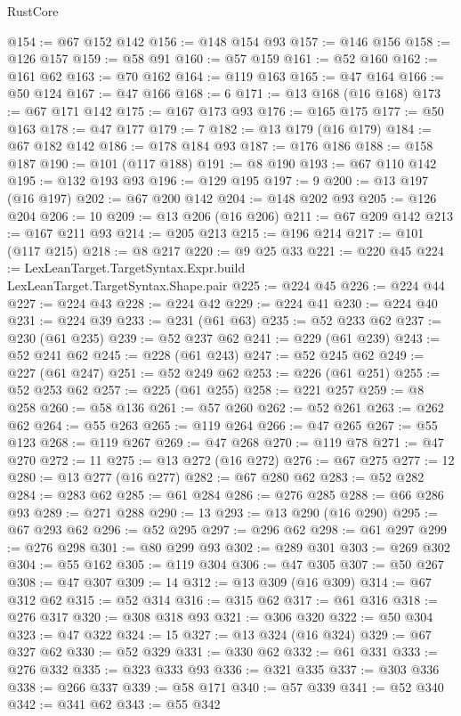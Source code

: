 \begin{lexlean}{RustCore}
\begin{coremodule}
@154 := @67 @152 @142
@156 := @148 @154 @93
@157 := @146 @156
@158 := @126 @157
@159 := @58 @91
@160 := @57 @159
@161 := @52 @160
@162 := @161 @62
@163 := @70 @162
@164 := @119 @163
@165 := @47 @164
@166 := @50 @124
@167 := @47 @166
@168 := 6
@171 := @13 @168 (@16 @168)
@173 := @67 @171 @142
@175 := @167 @173 @93
@176 := @165 @175
@177 := @50 @163
@178 := @47 @177
@179 := 7
@182 := @13 @179 (@16 @179)
@184 := @67 @182 @142
@186 := @178 @184 @93
@187 := @176 @186
@188 := @158 @187
@190 := @101 (@117 @188)
@191 := @8 @190
@193 := @67 @110 @142
@195 := @132 @193 @93
@196 := @129 @195
@197 := 9
@200 := @13 @197 (@16 @197)
@202 := @67 @200 @142
@204 := @148 @202 @93
@205 := @126 @204
@206 := 10
@209 := @13 @206 (@16 @206)
@211 := @67 @209 @142
@213 := @167 @211 @93
@214 := @205 @213
@215 := @196 @214
@217 := @101 (@117 @215)
@218 := @8 @217
@220 := @9 @25 @33
@221 := @220 @45
@224 := LexLeanTarget.TargetSyntax.Expr.build LexLeanTarget.TargetSyntax.Shape.pair
@225 := @224 @45
@226 := @224 @44
@227 := @224 @43
@228 := @224 @42
@229 := @224 @41
@230 := @224 @40
@231 := @224 @39
@233 := @231 (@61 @63)
@235 := @52 @233 @62
@237 := @230 (@61 @235)
@239 := @52 @237 @62
@241 := @229 (@61 @239)
@243 := @52 @241 @62
@245 := @228 (@61 @243)
@247 := @52 @245 @62
@249 := @227 (@61 @247)
@251 := @52 @249 @62
@253 := @226 (@61 @251)
@255 := @52 @253 @62
@257 := @225 (@61 @255)
@258 := @221 @257
@259 := @8 @258
@260 := @58 @136
@261 := @57 @260
@262 := @52 @261
@263 := @262 @62
@264 := @55 @263
@265 := @119 @264
@266 := @47 @265
@267 := @55 @123
@268 := @119 @267
@269 := @47 @268
@270 := @119 @78
@271 := @47 @270
@272 := 11
@275 := @13 @272 (@16 @272)
@276 := @67 @275
@277 := 12
@280 := @13 @277 (@16 @277)
@282 := @67 @280 @62
@283 := @52 @282
@284 := @283 @62
@285 := @61 @284
@286 := @276 @285
@288 := @66 @286 @93
@289 := @271 @288
@290 := 13
@293 := @13 @290 (@16 @290)
@295 := @67 @293 @62
@296 := @52 @295
@297 := @296 @62
@298 := @61 @297
@299 := @276 @298
@301 := @80 @299 @93
@302 := @289 @301
@303 := @269 @302
@304 := @55 @162
@305 := @119 @304
@306 := @47 @305
@307 := @50 @267
@308 := @47 @307
@309 := 14
@312 := @13 @309 (@16 @309)
@314 := @67 @312 @62
@315 := @52 @314
@316 := @315 @62
@317 := @61 @316
@318 := @276 @317
@320 := @308 @318 @93
@321 := @306 @320
@322 := @50 @304
@323 := @47 @322
@324 := 15
@327 := @13 @324 (@16 @324)
@329 := @67 @327 @62
@330 := @52 @329
@331 := @330 @62
@332 := @61 @331
@333 := @276 @332
@335 := @323 @333 @93
@336 := @321 @335
@337 := @303 @336
@338 := @266 @337
@339 := @58 @171
@340 := @57 @339
@341 := @52 @340
@342 := @341 @62
@343 := @55 @342

\end{coremodule}
\end{lexlean}
